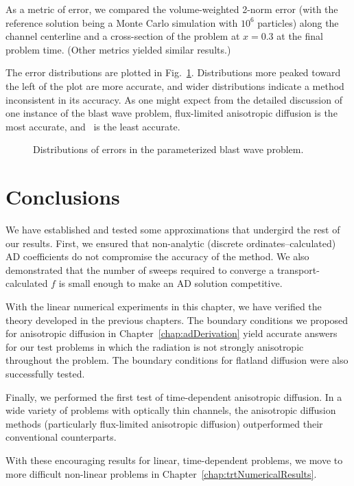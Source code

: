 As a metric of error, we compared the volume-weighted
2-norm error (with the reference solution being a Monte Carlo simulation
with $10^6$ particles) along the channel centerline and a cross-section of the
problem at $x=0.3$ at the final problem time. (Other metrics yielded similar
results.)

The error distributions are plotted in Fig.~\ref{fig:tdBlastwaveParameterized}.
Distributions more peaked toward the left of the plot are more accurate, and
wider distributions indicate a method inconsistent in its accuracy. As one might
expect from the detailed discussion of one instance of the blast wave problem,
flux-limited anisotropic diffusion is the most accurate, and \Pone\ is the least
accurate.

\begin{figure}[htb]
  \centering\small

  \caption{Distributions of errors in the parameterized blast wave problem.}
  \label{fig:tdBlastwaveParameterized}
\end{figure}

\section{Conclusions}

We have established and tested some approximations that undergird the rest of
our results.  First, we ensured that non-analytic (discrete
ordinates--calculated) AD coefficients do not compromise the accuracy of the
method. We also demonstrated that the number of sweeps required to converge a
transport-calculated $f$ is small enough to make an AD solution competitive.

With the linear numerical experiments in this chapter, we have verified the
theory developed in the previous chapters. The boundary conditions we proposed
for anisotropic diffusion in Chapter~\ref{chap:adDerivation} yield accurate
answers for our test problems in which the radiation is not strongly anisotropic
throughout the problem. The boundary conditions for flatland diffusion were also
successfully tested.

Finally, we performed the first test of time-dependent anisotropic diffusion. In
a wide variety of problems with optically thin channels, the anisotropic
diffusion methods (particularly flux-limited anisotropic diffusion) outperformed
their conventional counterparts.

With these encouraging results for linear, time-dependent problems, we move to
more difficult non-linear problems in Chapter~\ref{chap:trtNumericalResults}.

